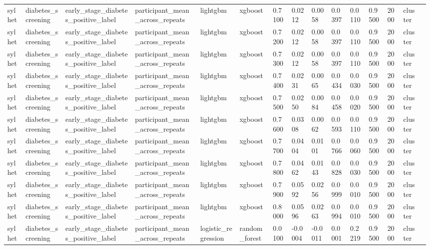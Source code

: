 \begin{tabular}{lllllllllllllll}
sylhet & diabetes\_screening & early\_stage\_diabetes\_positive\_label & participant\_mean\_across\_repeats & lightgbm & xgboost & 0.7100 & 0.0212 & 0.0058 & 0.0397 & 0.0110 & 0.9500 & 2000 & cluster &  \\
sylhet & diabetes\_screening & early\_stage\_diabetes\_positive\_label & participant\_mean\_across\_repeats & lightgbm & xgboost & 0.7200 & 0.0212 & 0.0058 & 0.0397 & 0.0110 & 0.9500 & 2000 & cluster &  \\
sylhet & diabetes\_screening & early\_stage\_diabetes\_positive\_label & participant\_mean\_across\_repeats & lightgbm & xgboost & 0.7300 & 0.0212 & 0.0058 & 0.0397 & 0.0110 & 0.9500 & 2000 & cluster &  \\
sylhet & diabetes\_screening & early\_stage\_diabetes\_positive\_label & participant\_mean\_across\_repeats & lightgbm & xgboost & 0.7400 & 0.0231 & 0.0065 & 0.0434 & 0.0030 & 0.9500 & 2000 & cluster &  \\
sylhet & diabetes\_screening & early\_stage\_diabetes\_positive\_label & participant\_mean\_across\_repeats & lightgbm & xgboost & 0.7500 & 0.0250 & 0.0084 & 0.0458 & 0.0020 & 0.9500 & 2000 & cluster &  \\
sylhet & diabetes\_screening & early\_stage\_diabetes\_positive\_label & participant\_mean\_across\_repeats & lightgbm & xgboost & 0.7600 & 0.0308 & 0.0062 & 0.0593 & 0.0110 & 0.9500 & 2000 & cluster &  \\
sylhet & diabetes\_screening & early\_stage\_diabetes\_positive\_label & participant\_mean\_across\_repeats & lightgbm & xgboost & 0.7700 & 0.0404 & 0.0101 & 0.0766 & 0.0060 & 0.9500 & 2000 & cluster &  \\
sylhet & diabetes\_screening & early\_stage\_diabetes\_positive\_label & participant\_mean\_across\_repeats & lightgbm & xgboost & 0.7800 & 0.0462 & 0.0143 & 0.0828 & 0.0030 & 0.9500 & 2000 & cluster &  \\
sylhet & diabetes\_screening & early\_stage\_diabetes\_positive\_label & participant\_mean\_across\_repeats & lightgbm & xgboost & 0.7900 & 0.0592 & 0.0256 & 0.0999 & 0.0010 & 0.9500 & 2000 & cluster &  \\
sylhet & diabetes\_screening & early\_stage\_diabetes\_positive\_label & participant\_mean\_across\_repeats & lightgbm & xgboost & 0.8000 & 0.0596 & 0.0263 & 0.0994 & 0.0010 & 0.9500 & 2000 & cluster &  \\
sylhet & diabetes\_screening & early\_stage\_diabetes\_positive\_label & participant\_mean\_across\_repeats & logistic\_regression & random\_forest & 0.0100 & -0.0004 & -0.0011 & 0.0001 & 0.2219 & 0.9500 & 2000 & cluster &  \\

\end{tabular}
